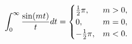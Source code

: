 \[\int_{0}^{\infty}\frac{\mathop{\sin\/}\nolimits\!\left(mt\right)}{t}dt=\begin{%
cases}\frac{1}{2}\pi,&m>0,\\
0,&m=0,\\
-\frac{1}{2}\pi,&m<0.\end{cases}\]